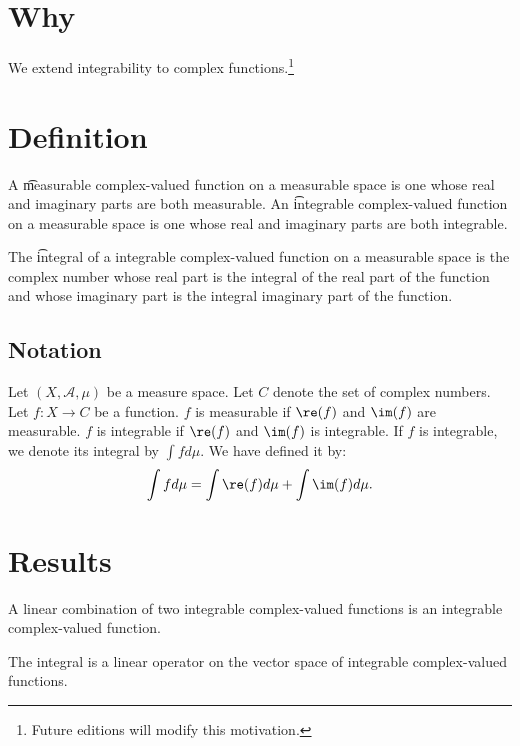 

\section*{Why}

We extend integrability to complex functions.\footnote{Future editions will modify this motivation.}

\section*{Definition}

A \t{measurable} complex-valued function on a measurable space is one whose real and imaginary parts are both measurable.
An \t{integrable} complex-valued function on a measurable space is one whose real and imaginary parts are both integrable.

The \t{integral} of a integrable complex-valued function on a measurable space is the complex number whose real part is the integral of the real part of the function and whose imaginary part is the integral imaginary part of the function.

\subsection*{Notation}

Let $(X, \mathcal{A} , \mu )$
be a measure space.
Let $C$ denote the set
of complex numbers.
Let $f: X \to C$
be a function.
$f$ is measurable
if $\re(f)$ and $\im(f)$
are measurable.
$f$ is integrable if
$\re(f)$ and $\im(f)$
is integrable.
If $f$ is integrable,
we denote its integral
by $\int f d\mu $.
We have defined it by:
\[
\int  f d\mu  = \int \re(f)d\mu  + \int  \im(f) d\mu .
\]

\section*{Results}

\begin{proposition}
A linear combination
of two integrable complex-valued
functions is an integrable
complex-valued function.
\end{proposition}

\begin{proposition}
The integral is a linear
operator on the vector space
of integrable complex-valued
functions.
\end{proposition}


